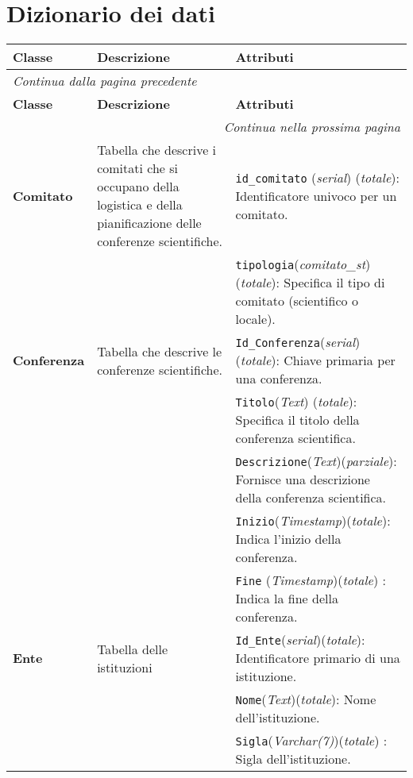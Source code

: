 \section{Dizionario dei dati}
\begin{longtable}{|p{}|p{}|p{}|}
\hline
\textbf{Classe} & \textbf{Descrizione} & \textbf{Attributi} \\
\hline
\endfirsthead

\multicolumn{3}{l}{\footnotesize\itshape Continua dalla pagina precedente} \\
\hline
\textbf{Classe} & \textbf{Descrizione} & \textbf{Attributi} \\
\hline
\endhead

\hline
\multicolumn{3}{r}{\footnotesize\itshape Continua nella prossima pagina} \\
\endfoot

\hline
\endlastfoot

	\textbf{Comitato} & Tabella che descrive i comitati che si occupano della logistica e della pianificazione delle conferenze scientifiche. & \texttt{id\_comitato} (\textit{serial}) (\textit{totale}): Identificatore univoco per un comitato. \\ 
	& & \texttt{tipologia}(\textit{comitato\_st})(\textit{totale}): Specifica il tipo di comitato (scientifico o locale). \\	\hline

	\textbf{Conferenza} & Tabella che descrive le conferenze scientifiche. & \texttt{Id\_Conferenza}(\textit{serial})(\textit{totale}): Chiave primaria per una conferenza. \\
	& & \texttt{Titolo}(\textit{Text}) (\textit{totale}): Specifica il titolo della conferenza scientifica. \\
	& & \texttt{Descrizione}(\textit{Text})(\textit{parziale}): Fornisce una descrizione della conferenza scientifica. \\
	& & \texttt{Inizio}(\textit{Timestamp})(\textit{totale}): Indica l'inizio della conferenza. \\
	& & \texttt{Fine} (\textit{Timestamp})(\textit{totale}) : Indica la fine della conferenza. \\	\hline

	\textbf{Ente} & Tabella delle istituzioni & \texttt{Id\_Ente}(\textit{serial})(\textit{totale}): Identificatore primario di una istituzione. \\
	& & \texttt{Nome}(\textit{Text})(\textit{totale}): Nome dell'istituzione. \\
	& & \texttt{Sigla}(\textit{Varchar(7)})(\textit{totale}) : Sigla dell'istituzione. \\	\hline
	

\end{longtable}
